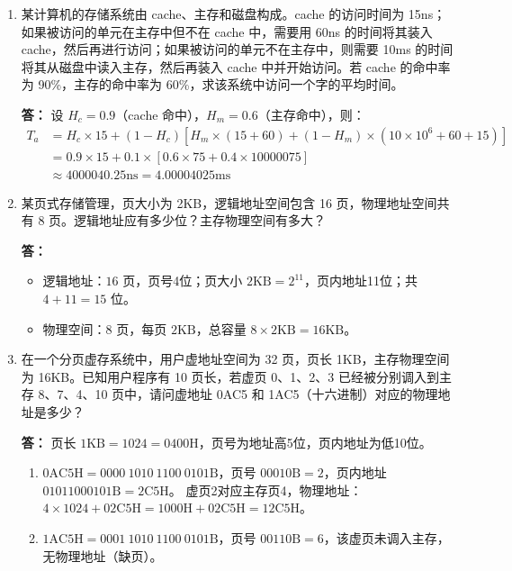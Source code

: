 \documentclass{article}
\begin{document}
\begin{enumerate}[label=\arabic*.]
    \item 某计算机的存储系统由 cache、主存和磁盘构成。cache 的访问时间为 15ns；如果被访问的单元在主存中但不在 cache 中，需要用 60ns 的时间将其装入 cache，然后再进行访问；如果被访问的单元不在主存中，则需要 10ms 的时间将其从磁盘中读入主存，然后再装入 cache 中并开始访问。若 cache 的命中率为 90\%，主存的命中率为 60\%，求该系统中访问一个字的平均时间。
    
    \textbf{答：}
    设 $H_c=0.9$（cache 命中），$H_m=0.6$（主存命中），则：
    \[
    \begin{aligned}
    T_a &= H_c\times15 + (1-H_c)\left[ H_m\times(15+60) + (1-H_m)\times(10\times10^6+60+15) \right] \\
    &= 0.9\times15 + 0.1\times\left[ 0.6\times75 + 0.4\times10000075 \right] \\
    &\approx 4000040.25\text{ns} = 4.00004025\text{ms}
    \end{aligned}
    \]

    \item 某页式存储管理，页大小为 2KB，逻辑地址空间包含 16 页，物理地址空间共有 8 页。逻辑地址应有多少位？主存物理空间有多大？
    
    \textbf{答：}
    \begin{itemize}
        \item 逻辑地址：$16$ 页，页号4位；页大小 $2\text{KB}=2^{11}$，页内地址11位；共 $4+11=15$ 位。
        \item 物理空间：$8$ 页，每页 $2\text{KB}$，总容量 $8\times2\text{KB}=16\text{KB}$。
    \end{itemize}

    \item 在一个分页虚存系统中，用户虚地址空间为 32 页，页长 1KB，主存物理空间为 16KB。已知用户程序有 10 页长，若虚页 0、1、2、3 已经被分别调入到主存 8、7、4、10 页中，请问虚地址 0AC5 和 1AC5（十六进制）对应的物理地址是多少？
    
    \textbf{答：}
    页长 $1\text{KB}=1024=0400\text{H}$，页号为地址高5位，页内地址为低10位。
    \begin{enumerate}[label=(\arabic*)]
        \item $0\text{AC5H}=0000\ 1010\ 1100\ 0101\text{B}$，页号 $00010\text{B}=2$，页内地址 $01011000101\text{B}=2\text{C5H}$。
        虚页2对应主存页4，物理地址：$4\times1024+02\text{C5H}=1000\text{H}+02\text{C5H}=12\text{C5H}$。
        \item $1\text{AC5H}=0001\ 1010\ 1100\ 0101\text{B}$，页号 $00110\text{B}=6$，该虚页未调入主存，无物理地址（缺页）。
    \end{enumerate}


\end{enumerate}
\end{document}
